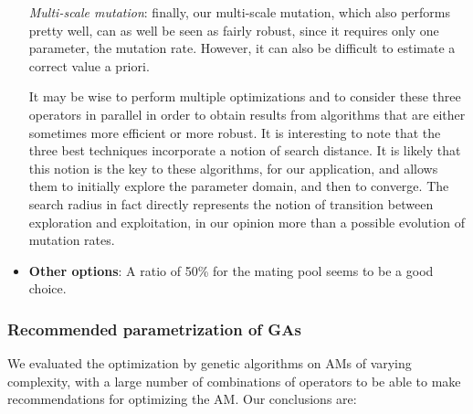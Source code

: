 \documentclass[twocol]{ametsoc}
\begin{document}
\begin{itemize}
	\textit{Multi-scale mutation}: finally, our multi-scale mutation, which also performs pretty well, can as well be seen as fairly robust, since it requires only one parameter, the mutation rate. However, it can also be difficult to estimate a correct value a priori.
	
	It may be wise to perform multiple optimizations and to consider these three operators in parallel in order to obtain results from algorithms that are either sometimes more efficient or more robust. It is interesting to note that the three best techniques incorporate a notion of search distance. It is likely that this notion is the key to these algorithms, for our application, and allows them to initially explore the parameter domain, and then to converge. The search radius in fact directly represents the notion of transition between exploration and exploitation, in our opinion more than a possible evolution of mutation rates.
	
	\item \textbf{Other options}: A ratio of 50\% for the mating pool seems to be a good choice.
	
\end{itemize}


\subsubsection{Recommended parametrization of GAs}

We evaluated the optimization by genetic algorithms on AMs of varying complexity, with a large number of combinations of operators to be able to make recommendations for optimizing the AM. Our conclusions are:
\end{document}
